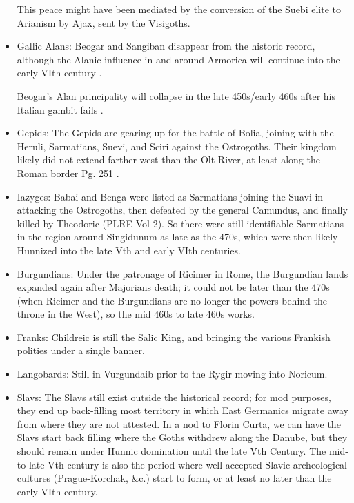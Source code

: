 \documentclass{article}
\newcommand{\specificCite}[1]{\tiny #1 \normalsize}
\begin{document}
\begin{itemize}
		This peace might have been mediated by the conversion of the Suebi elite to Arianism by Ajax, sent by the Visigoths.
		
		\item Gallic Alans:\newline
		Beogar and Sangiban disappear from the historic record, although the Alanic influence in and around Armorica will continue into the early VIth century \cite{BachrachAlans}.
		
		Beogar's Alan principality will collapse in the late 450s/early 460s after his Italian gambit fails \cite{BachrachAlans}.
		
		\item Gepids:\newline
		The Gepids are gearing up for the battle of Bolia, joining with the Heruli, Sarmatians, Suevi, and Sciri against the Ostrogoths.
		Their kingdom likely did not extend farther west than the Olt River, at least along the Roman border \cite{GepidsInBalkans}\specificCite{Pg. 251}.
		
		\item Iazyges:\newline
		Babai and Benga were listed as Sarmatians joining the Suavi in attacking the Ostrogoths, then defeated by the general Camundus, and finally killed by Theodoric (PLRE Vol 2). So there were still identifiable Sarmatians in the region around Singidunum as late as the 470s, which were then likely Hunnized into the late Vth and early VIth centuries.
		
		\item Burgundians:\newline
		Under the patronage of Ricimer in Rome, the Burgundian lands expanded again after Majorians death; it could not be later than the 470s (when Ricimer and the Burgundians are no longer the powers behind the throne in the West), so the mid 460s to late 460s works.
		
		\item Franks:\newline
		Childreic is still the Salic King, and bringing the various Frankish polities under a single banner.
		
		\item Langobards:\newline
		Still in Vurgundaib prior to the Rygir moving into Noricum.
		
		\item Slavs:\newline
		The Slavs still exist outside the historical record; for mod purposes, they end up back-filling most territory in which East Germanics migrate away from where they are not attested.
		In a nod to Florin Curta, we can have the Slavs start back filling where the Goths withdrew along the Danube, but they should remain under Hunnic domination until the late Vth Century.
		The mid-to-late Vth century is also the period where well-accepted Slavic archeological cultures (Prague-Korchak, \&c.) start to form, or at least no later than the early VIth century.
	\end{itemize}
	
\end{document}
